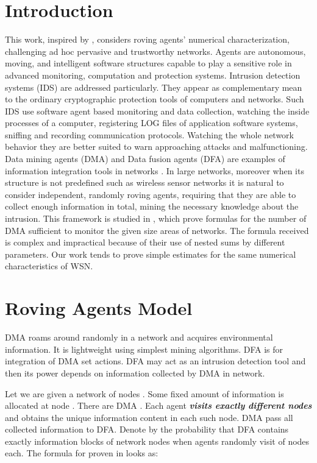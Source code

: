 \documentclass[conference]{IEEEtran}
\begin{document}
\section{Introduction}
This work, inspired by \cite{krugelmobileagent,irarandomagents,brandesnetanalysis}, considers roving agents' numerical characterization, challenging ad hoc pervasive and trustworthy networks. Agents are autonomous, moving, and intelligent software structures capable to play a sensitive role in advanced monitoring, computation and protection systems. Intrusion detection systems (IDS) \cite{krugelmobileagent} are addressed particularly. They appear as complementary mean to the ordinary cryptographic protection tools of computers and networks. Such IDS use software agent based monitoring and data collection, watching the inside processes of a computer, registering LOG files of application software systems, sniffing and recording communication protocols. Watching the whole network behavior they are better suited to warn approaching attacks and malfunctioning. Data mining agents (DMA) and Data fusion agents (DFA) are examples of information integration tools in networks \cite{irarandomagents}. In large networks, moreover when its structure is not predefined such as wireless sensor networks \cite{brandesnetanalysis} it is natural to consider independent, randomly roving agents, requiring that they are able to collect enough information in total, mining the necessary knowledge about the intrusion. This framework is studied in \cite{irarandomagents}, which prove formulas for the number of DMA sufficient to monitor the given size areas of networks. The formula received is complex and impractical because of their use of nested sums by different parameters. Our work tends to prove simple estimates for the same numerical characteristics of WSN.

\section{Roving Agents Model}
DMA roams around randomly in a network and acquires environmental information. It is lightweight using simplest mining algorithms. DFA is for integration of DMA set actions. DFA may act as an intrusion detection tool and then its power depends on information collected by DMA in network.

Let we are given a network  of  nodes . Some fixed amount of information  is allocated at node . There are  DMA  . Each agent \textit{\textbf{visits exactly  different nodes}} and obtains the unique information content in each such node. DMA pass all collected information to DFA. Denote by  the probability that DFA contains exactly  information blocks of network nodes when  agents randomly visit  of  nodes each. The formula for  proven in \cite{irarandomagents} looks as:
\end{document}
